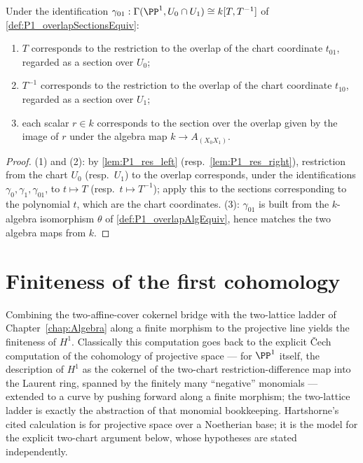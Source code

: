 \begin{lemma}
  \label{lem:P1_laurent_generators}
  \leanok
  Under the identification
  \(\gamma_{01} : \Gamma(\PP^1, U_0 \cap U_1) \cong k[T, T^{-1}]\) of
  \ref{def:P1_overlapSectionsEquiv}:
  \begin{enumerate}
    \item \(T\) corresponds to the restriction to the overlap of the chart coordinate
      \(t_{01}\), regarded as a section over \(U_0\);
    \item \(T^{-1}\) corresponds to the restriction to the overlap of the chart
      coordinate \(t_{10}\), regarded as a section over \(U_1\);
    \item each scalar \(r \in k\) corresponds to the section over the overlap given by
      the image of \(r\) under the algebra map \(k \to A_{(X_0X_1)}\).
  \end{enumerate}
\end{lemma}
\begin{proof}
  \leanok
  (1) and (2): by \ref{lem:P1_res_left} (resp.\ \ref{lem:P1_res_right}), restriction from
  the chart \(U_0\) (resp.\ \(U_1\)) to the overlap corresponds, under the
  identifications \(\gamma_0, \gamma_1, \gamma_{01}\), to \(t \mapsto T\) (resp.\
  \(t \mapsto T^{-1}\)); apply this to the sections corresponding to the polynomial
  \(t\), which are the chart coordinates. (3): \(\gamma_{01}\) is built from the
  \(k\)-algebra isomorphism \(\theta\) of \ref{def:P1_overlapAlgEquiv}, hence matches the
  two algebra maps from \(k\).
\end{proof}

\section{Finiteness of the first cohomology}

Combining the two-affine-cover cokernel bridge with the two-lattice ladder of
Chapter~\ref{chap:Algebra} along a finite morphism to the projective line yields the
finiteness of \(H^1\). Classically this computation goes back to the explicit \v{C}ech
computation of the cohomology of projective space --- for \(\PP^1\) itself, the
description of \(H^1\) as the cokernel of the two-chart restriction-difference map into
the Laurent ring, spanned by the finitely many ``negative'' monomials --- extended to a
curve by pushing forward along a finite morphism; the two-lattice ladder is exactly the
abstraction of that monomial bookkeeping.
Hartshorne's cited calculation is for projective space over a Noetherian base; it is the
model for the explicit two-chart argument below, whose hypotheses are stated independently.

